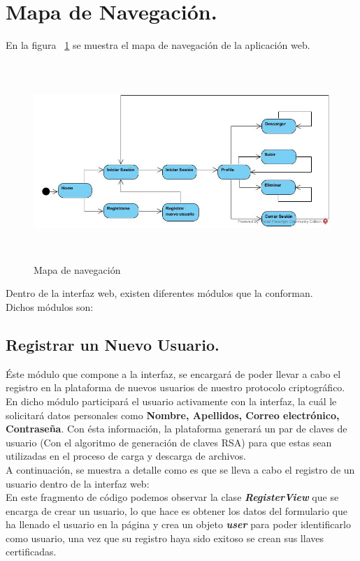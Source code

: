 \section{Mapa de Navegación. }
En la figura  ~\ref{fig:6-1-1} se muestra el mapa de navegación de la aplicación web.

			\begin{figure}[H]
			\centering
			\includegraphics[width=14cm, height=7.5cm]{./images/MapaDeNavegacion.jpg}
			\caption{Mapa de navegación}
			\label{fig:6-1-1} 
			\end{figure}

Dentro de la interfaz web, existen diferentes módulos que la conforman. \\ Dichos módulos son: 

\subsection{Registrar un Nuevo Usuario. } 
Éste módulo que compone a la interfaz, se encargará de poder llevar a cabo el registro en la plataforma de nuevos usuarios de nuestro protocolo criptográfico. En dicho módulo participará el usuario activamente con la interfaz, la cuál le solicitará datos personales como \textbf{Nombre, Apellidos, Correo electrónico, Contraseña}. Con ésta información, la plataforma generará un par de claves de usuario (Con el algoritmo de generación de claves RSA) para que estas sean utilizadas en el proceso de carga y descarga de archivos. \\ 

A continuación, se muestra a detalle como es que se lleva a cabo el registro de un usuario dentro de la interfaz web: \\ 

En este fragmento de código podemos observar la clase \textbf{\textit{RegisterView}} que se encarga de crear un usuario, lo que hace es obtener los datos del formulario que ha llenado el usuario en la página y crea un objeto \textbf{\textit{user}} para poder identificarlo como usuario, una vez que su registro haya sido exitoso se crean sus llaves certificadas.

